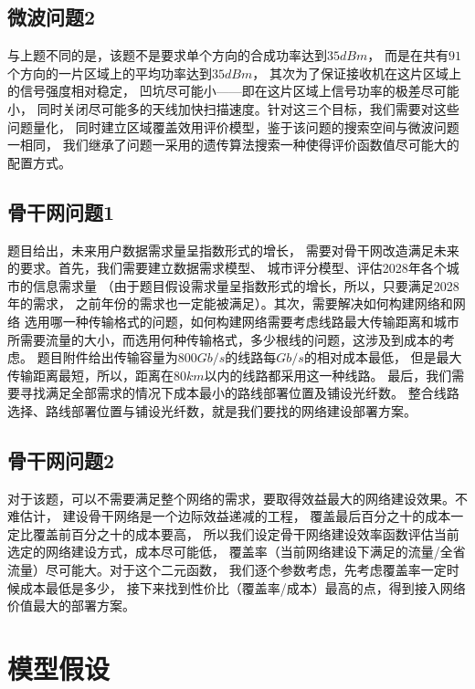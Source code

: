 \documentclass[UTF8,12pt]{ctexart}
\begin{document}
    \subsection{微波问题2}
        与上题不同的是，该题不是要求单个方向的合成功率达到$35dBm$，
        而是在共有$91$个方向的一片区域上的平均功率达到$35dBm$，
        其次为了保证接收机在这片区域上的信号强度相对稳定，
        凹坑尽可能小——即在这片区域上信号功率的极差尽可能小，
        同时关闭尽可能多的天线加快扫描速度。针对这三个目标，我们需要对这些问题量化，
        同时建立区域覆盖效用评价模型，鉴于该问题的搜索空间与微波问题一相同，
        我们继承了问题一采用的遗传算法搜索一种使得评价函数值尽可能大的配置方式。
\newpage
    \subsection{骨干网问题1}
        题目给出，未来用户数据需求量呈指数形式的增长，
        需要对骨干网改造满足未来的要求。首先，我们需要建立数据需求模型、
        城市评分模型、评估2028年各个城市的信息需求量
        （由于题目假设需求量呈指数形式的增长，所以，只要满足2028年的需求，
        之前年份的需求也一定能被满足）。其次，需要解决如何构建网络和网络
        选用哪一种传输格式的问题，如何构建网络需要考虑线路最大传输距离和城市
        所需要流量的大小，而选用何种传输格式，多少根线的问题，这涉及到成本的考虑。
        题目附件给出传输容量为$800Gb/s$的线路每$Gb/s$的相对成本最低，
        但是最大传输距离最短，所以，距离在$80km$以内的线路都采用这一种线路。
        最后，我们需要寻找满足全部需求的情况下成本最小的路线部署位置及铺设光纤数。
        整合线路选择、路线部署位置与铺设光纤数，就是我们要找的网络建设部署方案。

    \subsection{骨干网问题2}
        对于该题，可以不需要满足整个网络的需求，要取得效益最大的网络建设效果。不难估计，
        建设骨干网络是一个边际效益递减的工程，
        覆盖最后百分之十的成本一定比覆盖前百分之十的成本要高，
        所以我们设定骨干网络建设效率函数评估当前选定的网络建设方式，成本尽可能低，
        覆盖率（当前网络建设下满足的流量/全省流量）尽可能大。对于这个二元函数，
        我们逐个参数考虑，先考虑覆盖率一定时候成本最低是多少，
        接下来找到性价比（覆盖率/成本）最高的点，得到接入网络价值最大的部署方案。
        
        


\newpage
\section{模型假设}\label{mxjs}
\end{document}
